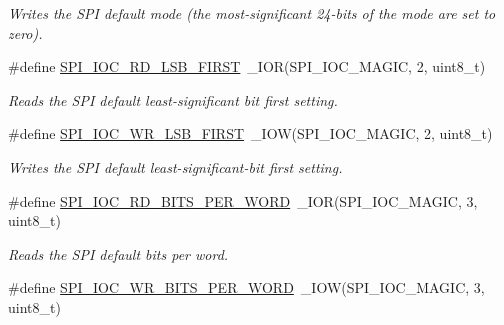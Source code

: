 \begin{DoxyCompactItemize}
\begin{DoxyCompactList}\small\item\em Writes the S\+PI default mode (the most-\/significant 24-\/bits of the mode are set to zero). \end{DoxyCompactList}\item 
\mbox{\label{group__SPILinux_ga214f207a72db148aac18311940b24897}} 
\#define \mbox{\hyperlink{group__SPILinux_ga214f207a72db148aac18311940b24897}{S\+P\+I\+\_\+\+I\+O\+C\+\_\+\+R\+D\+\_\+\+L\+S\+B\+\_\+\+F\+I\+R\+ST}}~\+\_\+\+I\+OR(S\+P\+I\+\_\+\+I\+O\+C\+\_\+\+M\+A\+G\+IC, 2, uint8\+\_\+t)
\begin{DoxyCompactList}\small\item\em Reads the S\+PI default least-\/significant bit first setting. \end{DoxyCompactList}\item 
\mbox{\label{group__SPILinux_gaa22ea43c664f050b4e66d5ffe17c59af}} 
\#define \mbox{\hyperlink{group__SPILinux_gaa22ea43c664f050b4e66d5ffe17c59af}{S\+P\+I\+\_\+\+I\+O\+C\+\_\+\+W\+R\+\_\+\+L\+S\+B\+\_\+\+F\+I\+R\+ST}}~\+\_\+\+I\+OW(S\+P\+I\+\_\+\+I\+O\+C\+\_\+\+M\+A\+G\+IC, 2, uint8\+\_\+t)
\begin{DoxyCompactList}\small\item\em Writes the S\+PI default least-\/significant-\/bit first setting. \end{DoxyCompactList}\item 
\mbox{\label{group__SPILinux_ga085ff1cbc1b6167023e666e1fbda75c7}} 
\#define \mbox{\hyperlink{group__SPILinux_ga085ff1cbc1b6167023e666e1fbda75c7}{S\+P\+I\+\_\+\+I\+O\+C\+\_\+\+R\+D\+\_\+\+B\+I\+T\+S\+\_\+\+P\+E\+R\+\_\+\+W\+O\+RD}}~\+\_\+\+I\+OR(S\+P\+I\+\_\+\+I\+O\+C\+\_\+\+M\+A\+G\+IC, 3, uint8\+\_\+t)
\begin{DoxyCompactList}\small\item\em Reads the S\+PI default bits per word. \end{DoxyCompactList}\item 
\mbox{\label{group__SPILinux_ga7519caddc083bddc9ff601c0cac53fe4}} 
\#define \mbox{\hyperlink{group__SPILinux_ga7519caddc083bddc9ff601c0cac53fe4}{S\+P\+I\+\_\+\+I\+O\+C\+\_\+\+W\+R\+\_\+\+B\+I\+T\+S\+\_\+\+P\+E\+R\+\_\+\+W\+O\+RD}}~\+\_\+\+I\+OW(S\+P\+I\+\_\+\+I\+O\+C\+\_\+\+M\+A\+G\+IC, 3, uint8\+\_\+t)

\end{DoxyCompactItemize}
